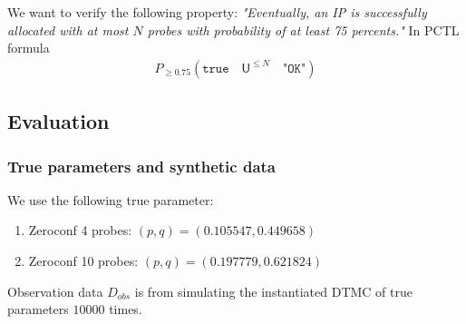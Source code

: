 We want to verify the following property: \textit{"Eventually, an IP is successfully allocated with
    at most $N$ probes with probability of at least 75 percents."} In PCTL formula
\begin{align*}
    P_{\geq 0.75} ( \texttt{true} \quad \mathsf{U}^{\leq N} \quad \texttt{"OK"} )
\end{align*}

\subsection{Evaluation}
\subsubsection{True parameters and synthetic data}
We use the following true parameter:
\begin{enumerate}
    \item Zeroconf 4 probes: $(p,q)=(0.105547, 0.449658)$
    \item Zeroconf 10 probes: $(p,q)=(0.197779, 0.621824)$
\end{enumerate}
Observation data $D_{obs}$ is from simulating the instantiated DTMC of true parameters $10000$ times.
